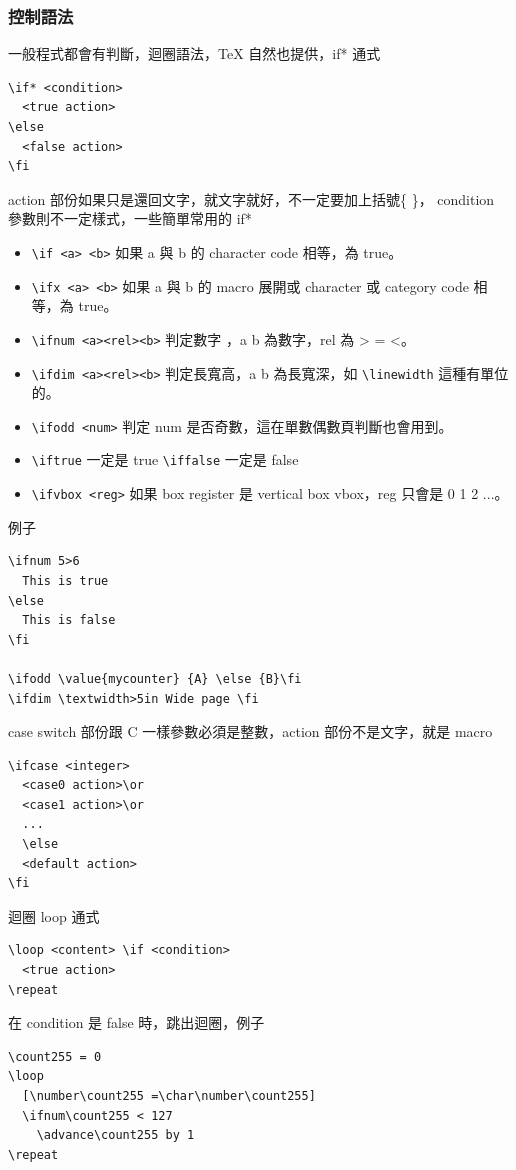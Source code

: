     \subsubsection{控制語法}
    一般程式都會有判斷，迴圈語法，\TeX{} 自然也提供，if* 通式
    \begin{verbatim}
\if* <condition>
  <true action>
\else
  <false action>
\fi
    \end{verbatim}
    action 部份如果只是還回文字，就文字就好，不一定要加上括號\{ \}， condition
    參數則不一定樣式，一些簡單常用的 if*
    \begin{itemize}
      \item \verb=\if <a> <b>= 如果 a 與 b 的 character code 相等，為 true。
      \item \verb=\ifx <a> <b>= 如果 a 與 b 的 macro 展開或 character 或
        category code 相等，為 true。
      \item \verb=\ifnum <a><rel><b>= 判定數字 ，a b 為數字，rel 為 > = <。
      \item \verb=\ifdim <a><rel><b>= 判定長寬高，a b 為長寬深，如
        \verb=\linewidth= 這種有單位的。
      \item \verb=\ifodd <num>= 判定 num 是否奇數，這在單數偶數頁判斷也會用到。
      \item \verb=\iftrue= 一定是 true \verb=\iffalse= 一定是 false
      \item \verb=\ifvbox <reg>= 如果 box register 是 vertical box vbox，reg
        只會是 0 1 2 ...。
    \end{itemize}
    例子
    \begin{verbatim}
\ifnum 5>6
  This is true
\else
  This is false
\fi

\ifodd \value{mycounter} {A} \else {B}\fi
\ifdim \textwidth>5in Wide page \fi
    \end{verbatim}
    case switch 部份跟 C 一樣參數必須是整數，action 部份不是文字，就是 macro
    \begin{verbatim}
\ifcase <integer>
  <case0 action>\or
  <case1 action>\or
  ...
  \else
  <default action>
\fi
    \end{verbatim}
    迴圈 loop 通式
    \begin{verbatim}
\loop <content> \if <condition>
  <true action>
\repeat
    \end{verbatim}
    在 condition 是 false 時，跳出迴圈，例子
    \begin{verbatim}
\count255 = 0
\loop
  [\number\count255 =\char\number\count255]
  \ifnum\count255 < 127
    \advance\count255 by 1
\repeat
    \end{verbatim}

